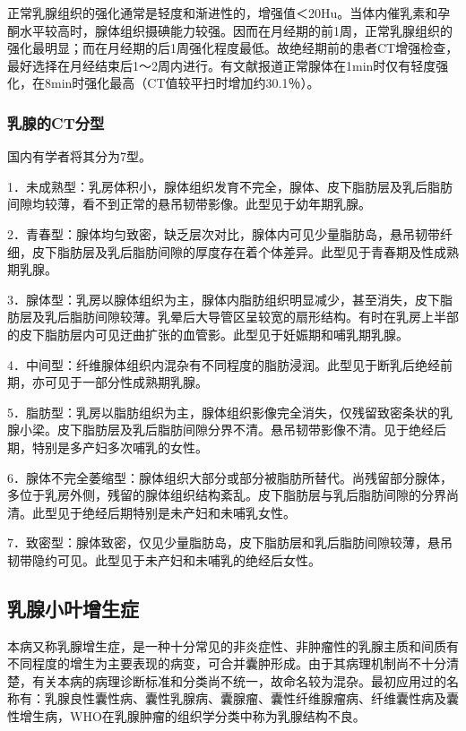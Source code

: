 正常乳腺组织的强化通常是轻度和渐进性的，增强值＜20Hu。当体内催乳素和孕酮水平较高时，腺体组织摄碘能力较强。因而在月经期的前1周，正常乳腺组织的强化最明显；而在月经期的后1周强化程度最低。故绝经期前的患者CT增强检查，最好选择在月经结束后1～2周内进行。有文献报道正常腺体在1min时仅有轻度强化，在8min时强化最高（CT值较平扫时增加约30.1％）。

\subsubsection{乳腺的CT分型}

国内有学者将其分为7型。

1．未成熟型：乳房体积小，腺体组织发育不完全，腺体、皮下脂肪层及乳后脂肪间隙均较薄，看不到正常的悬吊韧带影像。此型见于幼年期乳腺。

2．青春型：腺体均匀致密，缺乏层次对比，腺体内可见少量脂肪岛，悬吊韧带纤细，皮下脂肪层及乳后脂肪间隙的厚度存在着个体差异。此型见于青春期及性成熟期乳腺。

3．腺体型：乳房以腺体组织为主，腺体内脂肪组织明显减少，甚至消失，皮下脂肪层及乳后脂肪间隙较薄。乳晕后大导管区呈较宽的扇形结构。有时在乳房上半部的皮下脂肪层内可见迂曲扩张的血管影。此型见于妊娠期和哺乳期乳腺。

4．中间型：纤维腺体组织内混杂有不同程度的脂肪浸润。此型见于断乳后绝经前期，亦可见于一部分性成熟期乳腺。

5．脂肪型：乳房以脂肪组织为主，腺体组织影像完全消失，仅残留致密条状的乳腺小梁。皮下脂肪层及乳后脂肪间隙分界不清。悬吊韧带影像不清。见于绝经后期，特别是多产妇多次哺乳的女性。

6．腺体不完全萎缩型：腺体组织大部分或部分被脂肪所替代。尚残留部分腺体，多位于乳房外侧，残留的腺体组织结构紊乱。皮下脂肪层与乳后脂肪间隙的分界尚清。此型见于绝经后期特别是未产妇和未哺乳女性。

7．致密型：腺体致密，仅见少量脂肪岛，皮下脂肪层和乳后脂肪间隙较薄，悬吊韧带隐约可见。此型见于未产妇和未哺乳的绝经后女性。

\subsection{乳腺小叶增生症}

本病又称乳腺增生症，是一种十分常见的非炎症性、非肿瘤性的乳腺主质和间质有不同程度的增生为主要表现的病变，可合并囊肿形成。由于其病理机制尚不十分清楚，有关本病的病理诊断标准和分类尚不统一，故命名较为混杂。最初应用过的名称有：乳腺良性囊性病、囊性乳腺病、囊腺瘤、囊性纤维腺瘤病、纤维囊性病及囊性增生病，WHO在乳腺肿瘤的组织学分类中称为乳腺结构不良。

